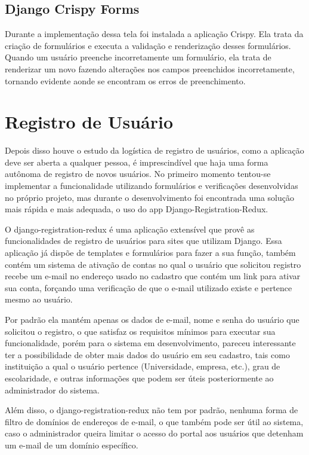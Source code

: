 \documentclass[tg]{mdtufsm}
\begin{document}
\subsection{Django Crispy Forms}
Durante a implementação dessa tela foi instalada a aplicação Crispy. Ela trata da criação de formulários e executa a validação e renderização desses formulários. Quando um usuário preenche incorretamente um formulário, ela trata de renderizar um novo fazendo alterações nos campos preenchidos incorretamente, tornando evidente aonde se encontram os erros de preenchimento.

\section{Registro de Usuário}
Depois disso houve o estudo da logística de registro de usuários, como a aplicação deve ser aberta a qualquer pessoa, é imprescindível que haja uma forma autônoma de registro de novos usuários. No primeiro momento tentou-se implementar a funcionalidade utilizando formulários e verificações desenvolvidas no próprio projeto, mas durante o desenvolvimento foi encontrada uma solução mais rápida e mais adequada, o uso do app Django-Registration-Redux.

O django-registration-redux é uma aplicação extensível que provê as funcionalidades de registro de usuários para sites que utilizam Django. Essa aplicação já dispõe de templates e formulários para fazer a sua função, também contém um sistema de ativação de contas no qual o usuário que solicitou registro recebe um e-mail no endereço usado no cadastro que contém um link para ativar sua conta, forçando uma verificação de que o e-mail utilizado existe e pertence mesmo ao usuário.

Por padrão ela mantém apenas os dados de e-mail, nome e senha do usuário que solicitou o registro, o que satisfaz os requisitos mínimos para executar sua funcionalidade, porém para o sistema em desenvolvimento, pareceu interessante ter a possibilidade de obter mais dados do usuário em seu cadastro, tais como instituição a qual o usuário pertence (Universidade, empresa, etc.), grau de escolaridade, e outras informações que podem ser úteis posteriormente ao administrador do sistema.

Além disso, o django-registration-redux não tem por padrão, nenhuma forma de filtro de domínios de endereços de e-mail, o que também pode ser útil ao sistema, caso o administrador queira limitar o acesso do portal aos usuários que detenham um e-mail de um domínio específico.
\end{document}
